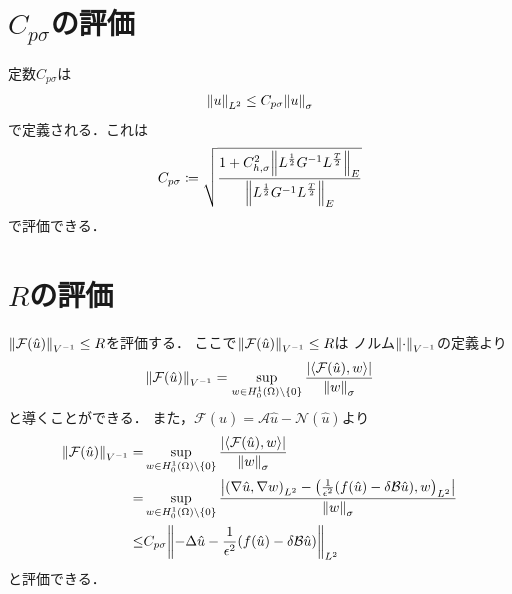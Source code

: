\section{\(C_{p\sigma}\)の評価}
定数\(C_{p\sigma}\)は
\begin{align}
   \norm{u}_{L^2}\leq C_{p\sigma} \norm{u}_{\sigma}
\end{align}
で定義される．これは
\begin{align}
  C_{p\sigma} \coloneqq 
  \sqrt{\dfrac{1+C_{h,\sigma}^2\norm{L^{\frac{1}{2}}G^{-1}L^{\frac{T}{2}}}_E}{\norm{L^{\frac{1}{2}}G^{-1}L^{\frac{T}{2}}}_E}}
\end{align}
で評価できる．
\section{\(R\)の評価}

\(\norm{\mathcal{F}\qty(\hat{u})}_{V^{-1}} \leq R\)を評価する．
ここで\(\norm{\mathcal{F}\qty(\hat{u})}_{V^{-1}} \leq R\)は
ノルム\(\norm{\cdot}_{V^{-1}}\)の定義より
\begin{align}
    \norm{\mathcal{F}\qty(\hat{u})}_{V^{-1}}
    = 
    \sup\limits_{w \in H^1_0\qty(\Omega) \backslash \{ 0 \} }
    \dfrac{\qty|\langle \mathcal{F}\qty(\hat{u}),w \rangle|}{\norm{w}_\sigma}
\end{align}
と導くことができる．
また，\( \mathcal{F}(\hat{u}) = \mathcal{A}\hat{u} - \mathcal{N}(\hat{u})\)より
\begin{align}
    \norm{\mathcal{F}\qty(\hat{u})}_{V^{-1}}
    =&
    \sup\limits_{w \in H^1_0\qty(\Omega) \backslash \{ 0 \} }
    \dfrac{\qty|\langle \mathcal{F}\qty(\hat{u}),w \rangle|}{\norm{w}_\sigma}\\
    =&
    \sup\limits_{w \in H^1_0\qty(\Omega) \backslash \{ 0 \} }
    \dfrac{\qty| \qty(\nabla \hat{u} , \nabla w)_{L^2}  -  \qty(\frac{1}{\epsilon^2}\qty(f(\hat{u})-\delta \mathcal{B}\hat{u}),w)_{L^2} |}{\norm{w}_\sigma}\\
    \leq&
    C_{p\sigma}\norm{-\Delta\hat{u}-\frac{1}{\epsilon^2}\qty(f(\hat{u})-\delta \mathcal{B}\hat{u})}_{L^2}
\end{align}
と評価できる．
